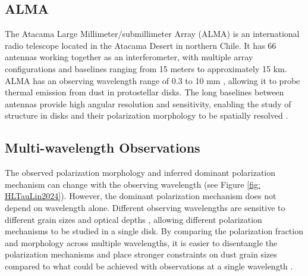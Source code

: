 


\subsection{ALMA}
The Atacama Large Millimeter/submillimeter Array
(ALMA) is an international radio telescope located in the Atacama Desert in northern Chile. It has 66 antennas working together as an interferometer, with multiple array configurations and baselines ranging from 15 meters to approximately 15 km. ALMA has an observing wavelength range of 0.3 to 10 mm \citep{Wotten}, allowing it to probe thermal emission from dust in protostellar disks. The long baselines between antennas provide high angular resolution and sensitivity, enabling the study of structure in disks and their polarization morphology to be spatially resolved \citep{Testi}. 

 








\subsection{Multi-wavelength Observations}
\label{sec: intro_mw}





The observed polarization morphology and inferred dominant polarization mechanism can change with the observing wavelength (see Figure \ref{fig: HLTauLin2024}). However, the dominant polarization mechanism does not depend on wavelength alone. Different observing wavelengths are sensitive to different grain sizes and optical depths \citep{Testi}, allowing different polarization mechanisms to be studied in a single disk. By comparing the polarization fraction and morphology across multiple wavelengths, it is easier to disentangle the polarization mechanisms and place stronger constraints on dust grain sizes compared to what could be achieved with observations at a single wavelength \citep{Kataoka_2015, Harrison2024}. 



